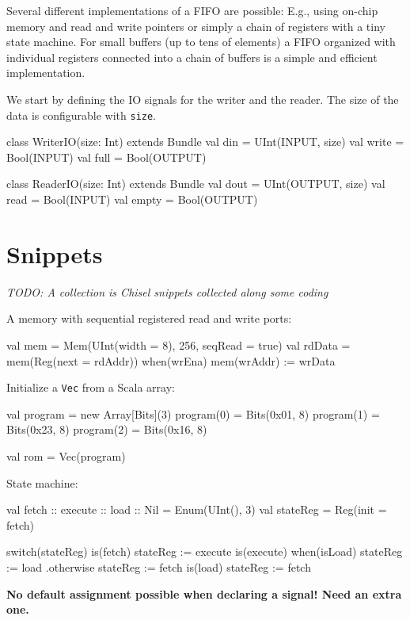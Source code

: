 \documentclass[a4paper]{article}
\newcommand{\code}[1]{{\small{\texttt{#1}}}}
\newcommand{\todo}[1]{{\emph{TODO: #1}}}
\begin{document}
Several different implementations of a FIFO are possible: E.g., using on-chip
memory and read and write pointers or simply a chain of registers with a
tiny state machine. For small buffers (up to tens of elements) a FIFO organized
with individual registers connected into a chain of buffers is a simple and efficient
implementation.

We start by defining the IO signals for the writer and the reader. The size of
the data is configurable with \code{size}.

\begin{chisel}
class WriterIO(size: Int) extends Bundle {
  val din = UInt(INPUT, size)
  val write = Bool(INPUT)
  val full = Bool(OUTPUT)
}

class ReaderIO(size: Int) extends Bundle {
  val dout = UInt(OUTPUT, size)
  val read = Bool(INPUT)
  val empty = Bool(OUTPUT)
}
\end{chisel}


\section{Snippets}

\todo{A collection is Chisel snippets collected along some coding}


A memory with sequential registered read and write ports:
\begin{chisel}
  val mem = Mem(UInt(width = 8), 256, seqRead = true)
  val rdData = mem(Reg(next = rdAddr))
  when(wrEna) {
    mem(wrAddr) := wrData
  }
\end{chisel}

Initialize a \code{Vec} from a Scala array:
\begin{chisel}
  val program = new Array[Bits](3)
  program(0) = Bits(0x01, 8)
  program(1) = Bits(0x23, 8)
  program(2) = Bits(0x16, 8)
    
  val rom = Vec(program)
\end{chisel}

State machine:
\begin{chisel}
  val fetch :: execute :: load :: Nil = Enum(UInt(), 3)
  val stateReg = Reg(init = fetch)

  switch(stateReg) {
    is(fetch) {
      stateReg := execute
    }
    is(execute) {
      when(isLoad) {
        stateReg := load
      }.otherwise {
        stateReg := fetch
      }
    }
    is(load) {
      stateReg := fetch
    }
  }
\end{chisel}

\textbf{No default assignment possible when declaring a signal! Need an extra one.}
\end{document}
